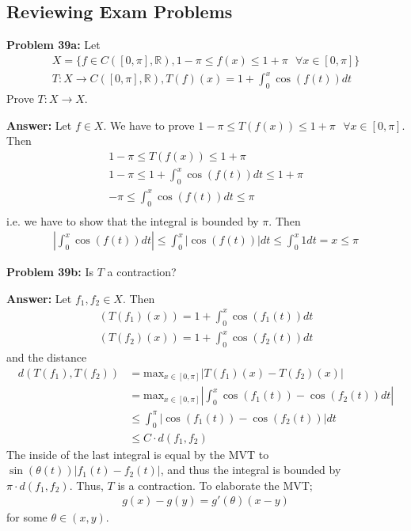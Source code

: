 \documentclass{article}
\newcommand*{\txt}[1]{\text{ #1 }}%
\newcommand*{\fora}{\txt{}\forall}%
\newcommand*{\rr}{\mathbb{R}}%
\begin{document}
\subsection{Reviewing Exam Problems}

\textbf{Problem 39a:} Let \begin{align*}
    X=\{f\in C([0,\pi],\rr), 1-\pi\leq f(x)\leq 1+\pi \fora x\in [0,\pi]\}\\
    T:X\to C([0,\pi],\rr), T(f)(x)=1+\int_{0}^{x}\cos(f(t))dt
\end{align*} Prove $T:X\to X$.

\textbf{Answer:} Let $f\in X$. We have to prove $1-\pi\leq T(f(x))\leq 1+\pi \fora x\in [0,\pi]$. Then \begin{align*}
    1-\pi\leq T(f(x))\leq 1+\pi\\
    1-\pi\leq 1+\int_{0}^{x}\cos(f(t))dt\leq 1+\pi\\
    -\pi\leq \int_{0}^{x}\cos(f(t))dt\leq \pi\\
\end{align*} i.e. we have to show that the integral is bounded by $\pi$. Then \begin{align*}
    |\int_{0}^{x}\cos(f(t))dt|\leq \int_{0}^{x}|\cos(f(t))|dt\leq \int_{0}^{x}1dt=x\leq \pi
\end{align*}

\textbf{Problem 39b:} Is $T$ a contraction?

\textbf{Answer:} Let $f_1,f_2\in X$. Then \begin{align*}
    (T(f_1)(x))=1+\int_{0}^{x}\cos(f_1(t))dt\\
    (T(f_2)(x))=1+\int_{0}^{x}\cos(f_2(t))dt
\end{align*} and the distance \begin{align*}
    d(T(f_1),T(f_2))&=\text{max}_{x\in[0,\pi]}|T(f_1)(x)-T(f_2)(x)|\\
    &=\text{max}_{x\in[0,\pi]}|\int_{0}^{x}\cos(f_1(t))-\cos(f_2(t))dt|\\
    &\leq \int_{0}^{\pi}|\cos(f_1(t))-\cos(f_2(t))|dt\\
    &\leq C\cdot d(f_1,f_2)
\end{align*} The inside of the last integral is equal by the MVT to $\sin(\theta(t))|f_1(t)-f_2(t)|$, and thus the integral is bounded by $\pi\cdot d(f_1,f_2)$. Thus, $T$ is a contraction. To elaborate the MVT; \begin{align*}
    g(x)-g(y)=g'(\theta)(x-y)
\end{align*} for some $\theta\in(x,y)$.
\end{document}
